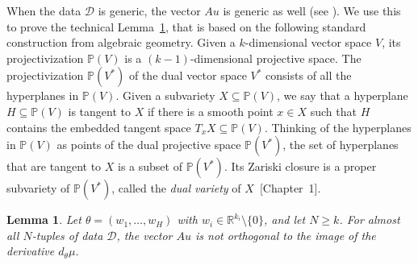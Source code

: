 \documentclass[twoside]{article}
\newtheorem{lemma}[theorem]{Lemma}
\theoremstyle{definition}
\theoremstyle{remark}
\begin{document}
When the data $\mathcal{D}$ is generic, the vector $Au$ is generic as well (see \cite[Section~7]{kohn2024function}). 
We use this to prove the  technical Lemma~\ref{lem:technical}, that is based on the following standard construction from algebraic geometry. 
Given a $k$-dimensional vector space $V$, its projectivization $\mathbb{P}(V)$ is a $(k-1)$-dimensional projective space.
The projectivization $\mathbb{P}(V^\ast)$ of the dual vector space $V^\ast$ consists of all the hyperplanes in  $\mathbb{P}(V)$.
Given a subvariety $X \subseteq \mathbb{P}(V)$, we say that a hyperplane $H \subseteq \mathbb{P}(V)$ is tangent to $X$ if there is a smooth point $x \in X$ such that $H$ contains the embedded tangent space $T_x X \subseteq \mathbb{P}(V)$.
Thinking of the hyperplanes in $\mathbb{P}(V)$ as points of the dual projective space $\mathbb{P}(V^\ast)$, the set of hyperplanes that are tangent to $X$ is a subset of $\mathbb{P}(V^\ast)$.
Its Zariski closure is a proper subvariety of $\mathbb{P}(V^\ast)$, called the \emph{dual variety} of $X$~[Chapter~1]\cite{gkz}.



\begin{lemma}
\label{lem:technical}
    Let $\theta = (w_1, \ldots, w_H)$ with $w_i \in \mathbb{R}^{k_i} \setminus \{ 0 \}$, and let $N \geq k$.
    For almost all $N$-tuples of data $\mathcal{D}$, the vector $Au$ is not orthogonal to the image of the derivative $d_\theta \mu$.
\end{lemma}
\end{document}
